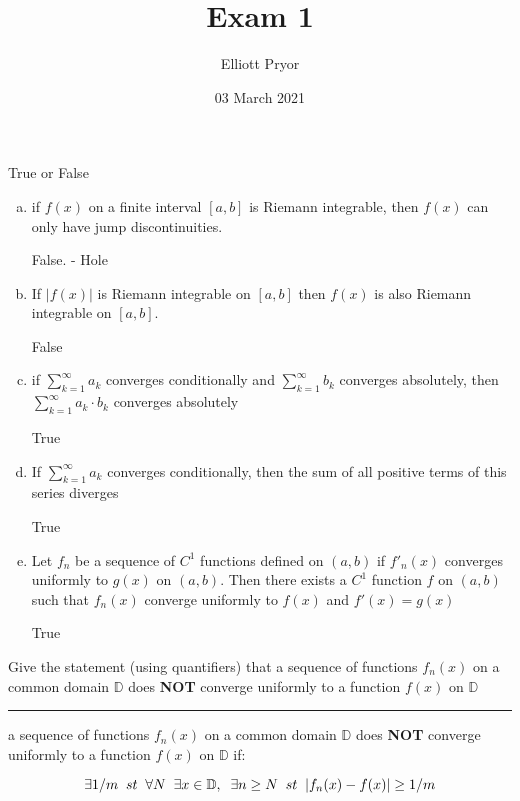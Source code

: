 \documentclass[11pt]{article}
\title{Exam 1}
\author{Elliott Pryor}
\date{03 March 2021}
\begin{document}
\maketitle


True or False

\begin{enumerate}[(a)]
    \item if $f(x)$ on a finite interval $[a,b]$ is Riemann integrable, 
    then $f(x)$ can only have jump discontinuities.

    False. - Hole
    
    \item If $|f(x)|$ is Riemann integrable on $[a,b]$ 
    then $f(x)$ is also Riemann integrable on $[a,b]$.

    False

    \item if $\sum_{k = 1} ^ \infty a_k$ converges conditionally and 
    $\sum_{k = 1} ^ \infty b_k$ converges absolutely, 
    then $\sum_{k = 1} ^ \infty a_k \cdot b_k$ converges absolutely

    True

    \item If $\sum_{k = 1} ^ \infty a_k$ converges conditionally, 
    then the sum of all positive terms of this series diverges

    True

    \item Let $f_n$ be a sequence of $C^1$ functions defined on $(a,b)$
    if $f'_n (x)$ converges uniformly to $g(x)$ on $(a,b)$. 
    Then there exists a $C^1$ function $f$ on $(a,b)$ such that $f_n(x)$ converge uniformly to $f(x)$
    and $f'(x) = g(x)$

    True

\end{enumerate}



Give the statement (using quantifiers) that a sequence of functions $f_n(x)$ 
on a common domain $\mathbb{D}$ does \textbf{NOT} converge uniformly to a function
$f(x)$ on $\mathbb{D}$

\hrule

a sequence of functions $f_n(x)$ 
on a common domain $\mathbb{D}$ does \textbf{NOT} converge uniformly to a function
$f(x)$ on $\mathbb{D}$ if: 

$$\exists 1/m \sp st \sp \forall N  \sp \exists x \in \mathbb{D}, \sp \exists n \geq N \sp st \sp |f_n(x) - f(x)| \geq 1/m$$
\end{document}
